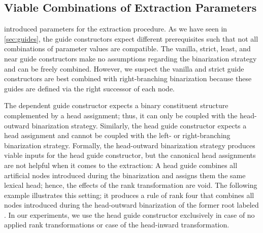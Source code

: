 \documentclass[../../document.tex]{subfiles}
\begin{document}

    \subsection{Viable Combinations of Extraction Parameters}\label{sec:viable-paramters}
     introduced parameters for the extraction procedure.
    As we have seen in \cref{sec:guides}, the guide constructors expect different prerequisites such that not all combinations of parameter values are compatible.
    The vanilla, strict, least, and near guide constructors make no assumptions regarding the binarization strategy and can be freely combined.
    However, we suspect the vanilla and strict guide constructors are best combined with right-branching binarization because these guides are defined via the right successor of each node.

    The dependent guide constructor expects a binary constituent structure complemented by a head assignment; thus, it can only be coupled with the head-outward binarization strategy.
    Similarly, the head guide constructor expects a head assignment and cannot be coupled with the left- or right-branching binarization strategy.
    Formally, the head-outward binarization strategy produces viable inputs for the head guide constructor, but the canonical head assignments are not helpful when it comes to the extraction:
        A head guide combines all artificial nodes introduced during the binarization and assigns them the same lexical head; hence, the effects of the rank transformation are void.
    The following example illustrates this setting; it produces a rule of rank four that combines all nodes introduced during the head-outward binarization of the former root labeled .
    In our experiments, we use the head guide constructor exclusively in case of no applied rank transformations or case of the head-inward transformation.
\end{document}

